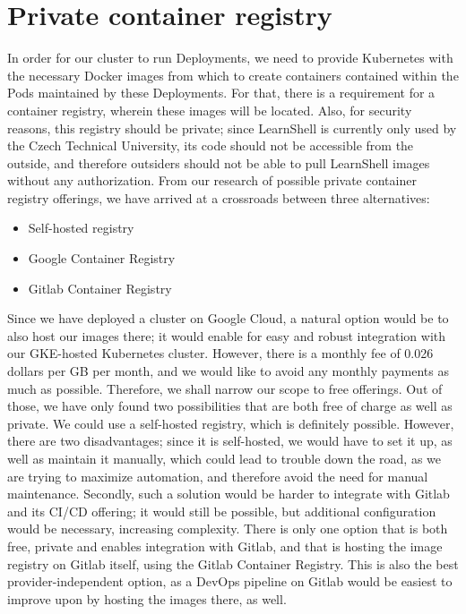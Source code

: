 \documentclass[thesis=B,english]{FITthesis}[2019/12/23]
\begin{document}
\section{Private container registry}

In order for our cluster to run Deployments, we need to provide Kubernetes with the necessary Docker images from which to create containers contained within the Pods maintained by these Deployments. For that, there is a requirement for a container registry, wherein these images will be located. Also, for security reasons, this registry should be private; since LearnShell is currently only used by the Czech Technical University, its code should not be accessible from the outside, and therefore outsiders should not be able to pull LearnShell images without any authorization. From our research of possible private container registry offerings, we have arrived at a crossroads between three alternatives:

\begin{itemize}
  \setlength\itemsep{0em}
  \item Self-hosted registry
  \item Google Container Registry
  \item Gitlab Container Registry
\end{itemize}

Since we have deployed a cluster on Google Cloud, a natural option would be to also host our images there; it would enable for easy and robust integration with our GKE-hosted Kubernetes cluster. However, there is a monthly fee of 0.026 dollars per GB per month, and we would like to avoid any monthly payments as much as possible. \cite{gcr-pricing} Therefore, we shall narrow our scope to free offerings. Out of those, we have only found two possibilities that are both free of charge as well as private. We could use a self-hosted registry, which is definitely possible. However, there are two disadvantages; since it is self-hosted, we would have to set it up, as well as maintain it manually, which could lead to trouble down the road, as we are trying to maximize automation, and therefore avoid the need for manual maintenance. Secondly, such a solution would be harder to integrate with Gitlab and its CI/CD offering; it would still be possible, but additional configuration would be necessary, increasing complexity. There is only one option that is both free, private and enables integration with Gitlab, and that is hosting the image registry on Gitlab itself, using the Gitlab Container Registry. This is also the best provider-independent option, as a DevOps pipeline on Gitlab would be easiest to improve upon by hosting the images there, as well.
\end{document}
